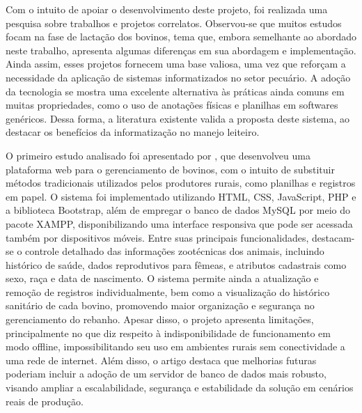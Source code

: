 Com o intuito de apoiar o desenvolvimento deste projeto, foi realizada uma pesquisa sobre trabalhos e projetos correlatos. Observou-se que muitos estudos focam na fase de lactação dos bovinos, tema que, embora semelhante ao abordado neste trabalho, apresenta algumas diferenças em sua abordagem e implementação. Ainda assim, esses projetos fornecem uma base valiosa, uma vez que reforçam a necessidade da aplicação de sistemas informatizados no setor pecuário. A adoção da tecnologia se mostra uma excelente alternativa às práticas ainda comuns em muitas propriedades, como o uso de anotações físicas e planilhas em softwares genéricos. Dessa forma, a literatura existente valida a proposta deste sistema, ao destacar os benefícios da informatização no manejo leiteiro.

O primeiro estudo analisado foi apresentado por \cite{SCHÄFFER2021}, que desenvolveu uma plataforma web para o gerenciamento de bovinos, com o intuito de substituir métodos tradicionais utilizados pelos produtores rurais, como planilhas e registros em papel. O sistema foi implementado utilizando HTML, CSS, JavaScript, PHP e a biblioteca Bootstrap, além de empregar o banco de dados MySQL por meio do pacote XAMPP, disponibilizando uma interface responsiva que pode ser acessada também por dispositivos móveis. Entre suas principais funcionalidades, destacam-se o controle detalhado das informações zootécnicas dos animais, incluindo histórico de saúde, dados reprodutivos para fêmeas, e atributos cadastrais como sexo, raça e data de nascimento. O sistema permite ainda a atualização e remoção de registros individualmente, bem como a visualização do histórico sanitário de cada bovino, promovendo maior organização e segurança no gerenciamento do rebanho. Apesar disso, o projeto apresenta limitações, principalmente no que diz respeito à indisponibilidade de funcionamento em modo offline, impossibilitando seu uso em ambientes rurais sem conectividade a uma rede de internet. Além disso, o artigo destaca que melhorias futuras poderiam incluir a adoção de um servidor de banco de dados mais robusto, visando ampliar a escalabilidade, segurança e estabilidade da solução em cenários reais de produção.

